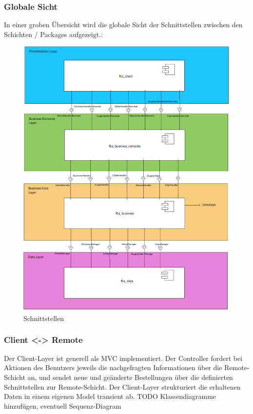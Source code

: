 \subsubsection{Globale Sicht}
In einer groben Übersicht wird die globale Sicht der Schnittstellen zwischen den Schichten / Packages aufgezeigt.:\\
\begin{figure}[H]
\centering
	\includegraphics[width=1.0\linewidth]{Images/Schnittstellen}
	\caption{Schnittstellen}
	\label{fig:schnittstellen}
\end{figure}

\subsubsection{Client <-> Remote}
Der Client-Layer ist generell als MVC implementiert. Der Controller fordert bei Aktionen des Benutzers jeweils die nachgefragten Informationen über die Remote-Schicht an, und sendet neue und geänderte Bestellungen über die definierten Schnittstellen zur Remote-Schicht.
Der Client-Layer strukturiert die erhaltenen Daten in einem eigenen Model transient ab.
TODO Klassendiagramme hinzufügen, eventuell Sequenz-Diagram

